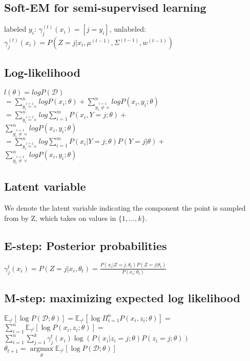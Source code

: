 \subsection*{Soft-EM for semi-supervised learning}
\noindent labeled $y_i$: $\gamma_j^{(t)}(x_i) = [j = y_i]$,
unlabeled:\\ $\gamma_j^{(t)}(x_i) = P(Z=j|x_i, \mu^{(t-1)}, \Sigma^{(t-1)}, w^{(t-1)})$

\subsection*{Log-likelihood}
\noindent $l(\theta) = log P(\mathcal{D})$ \\
$=\sum_{\overset{i=1}{y_i=\times}}^n log P(x_i;\theta) + \sum_{\overset{i=1}{y_i\not=\times}}^n log P(x_i,y_i;\theta)$\\
$=\sum_{\overset{i=1}{y_i=\times}}^n log \sum_{i=1}^m P(x_i, Y=j;\theta) +$\\
$ \sum_{\overset{i=1}{y_i\not=\times}}^n log P(x_i,y_i;\theta)$\\
$=\sum_{\overset{i=1}{y_i=\times}}^n log \sum_{i=1}^m P(x_i|Y=j;\theta)P(Y=j|\theta) +$\\
$ \sum_{\overset{i=1}{y_i\not=\times}}^n log P(x_i,y_i;\theta)$

\subsection*{Latent variable}
\noindent We denote the latent variable indicating the component the point is sampled from by Z, which takes on values in $\{1,...,k\}$.

\subsection*{E-step: Posterior probabilities}
\noindent $\gamma_j^t(x_i) = P(Z=j|x_i, \theta_t) = \frac{P(x_i|Z=j, \theta_t) P(Z=j|\theta_t)}{P(x_i;\theta_t)}$

\subsection*{M-step: maximizing expected log likelihood}
\noindent $\mathbb{E}_{\gamma^t}[\log P(\mathcal{D;\theta})] = 
\mathbb{E}_{\gamma^t}[\log \Pi_{i=1}^nP(x_i,z_i;\theta)] = $ \\
$\sum_{i=1}^n \mathbb{E}_{\gamma^t}[\log P(x_i,z_i;\theta)] = $ \\
$\sum_{i=1}^n \sum_{j=1}^k \gamma_j^t(x_i) \log (P(x_i|z_i=j;\theta) P(z_i=j;\theta))$ \\
$\theta_{t+1} = \underset{\theta}{\operatorname{argmax}} \mathbb{E}_{\gamma^t}[\log P(\mathcal{D;\theta})]$
